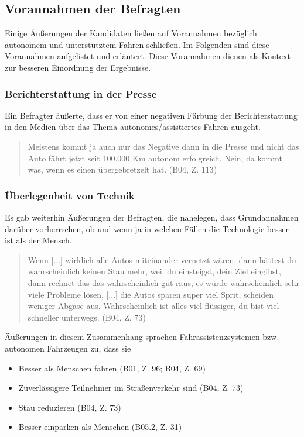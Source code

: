 \documentclass[12pt]{article}
\begin{document}
\subsection{Vorannahmen der Befragten}
Einige Äußerungen der Kandidaten ließen auf Vorannahmen bezüglich autonomem und unterstütztem Fahren schließen. Im Folgenden sind diese Vorannahmen aufgelistet und erläutert. Diese Vorannahmen dienen als Kontext zur besseren Einordnung der Ergebnisse.
\subsubsection*{Berichterstattung in der Presse}
Ein Befragter äußerte, dass er von einer negativen Färbung der Berichterstattung in den Medien über das Thema autonomes/assistiertes Fahren ausgeht.

\begin{quote}
  Meistens kommt ja auch nur das Negative dann in die Presse und nicht das Auto fährt jetzt seit 100.000 Km autonom erfolgreich. Nein, da kommt was, wenn es einen übergebretzelt hat. (B04, Z. 113)
\end{quote}

\subsubsection*{Überlegenheit von Technik}
Es gab weiterhin Äußerungen der Befragten, die nahelegen, dass Grundannahmen darüber vorherrschen, ob und wenn ja in welchen Fällen die Technologie besser ist als der Mensch.

\begin{quote}
  Wenn [...] wirklich alle Autos miteinander vernetzt wären, dann hättest du wahrscheinlich keinen Stau mehr, weil du einsteigst, dein Ziel eingibst, dann rechnet das das wahrscheinlich gut raus, es würde wahrscheinlich sehr viele Probleme lösen, [...] die Autos sparen super viel Sprit, scheiden weniger Abgase aus. Wahrscheinlich ist alles viel flüssiger, du bist viel schneller unterwegs. (B04, Z. 73)
\end{quote}

Äußerungen in diesem Zusammenhang sprachen Fahrassistenzsystemen bzw. autonomen Fahrzeugen zu, dass sie

\begin{itemize}
  \item Besser als Menschen fahren (B01, Z. 96; B04, Z. 69)
  \item Zuverlässigere Teilnehmer im Straßenverkehr sind (B04, Z. 73)
  \item Stau reduzieren (B04, Z. 73)
  \item Besser einparken als Menschen (B05.2, Z. 31)
\end{itemize}
\end{document}
